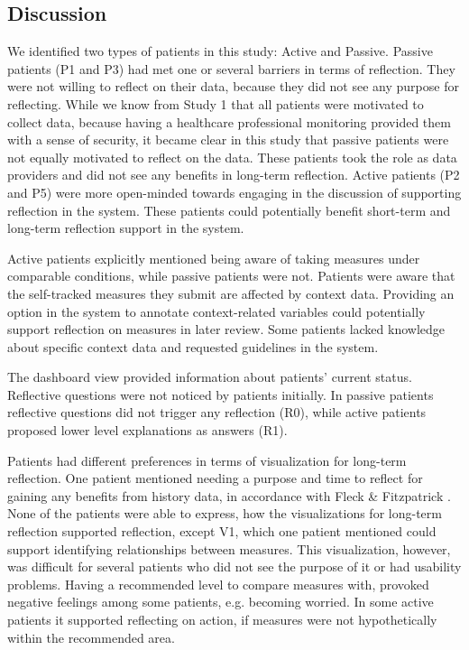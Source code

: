 \subsection{Discussion}
We identified two types of patients in this study: Active and Passive. Passive patients (P1 and P3) had met one or several barriers in terms of reflection. They were not willing to reflect on their data, because they did not see any purpose for reflecting. While we know from Study 1 that all patients were motivated to collect data, because having a healthcare professional monitoring provided them with a sense of security, it became clear in this study that passive patients were not equally motivated to reflect on the data. These patients took the role as data providers and did not see any benefits in long-term reflection. Active patients (P2 and P5) were more open-minded towards engaging in the discussion of supporting reflection in the system. These patients could potentially benefit short-term and long-term reflection support in the system.

Active patients explicitly mentioned being aware of taking measures under comparable conditions, while passive patients were not. Patients were aware that the self-tracked measures they submit are affected by context data. Providing an option in the system to annotate context-related variables could potentially support reflection on measures in later review. Some patients lacked knowledge about specific context data and requested guidelines in the system. 

The dashboard view provided information about patients’ current status. Reflective questions were not noticed by patients initially. In passive patients reflective questions did not trigger any reflection (R0), while active patients proposed lower level explanations as answers (R1). 

Patients had different preferences in terms of visualization for long-term reflection. One patient mentioned needing a purpose and time to reflect for gaining any benefits from history data, in accordance with Fleck \& Fitzpatrick \cite{Fleck}. None of the patients were able to express, how the visualizations for long-term reflection supported reflection, except V1, which one patient mentioned could support identifying relationships between measures. This visualization, however, was difficult for several patients who did not see the purpose of it or had usability problems. Having a recommended level to compare measures with, provoked negative feelings among some patients, e.g. becoming worried. In some active patients it supported reflecting on action, if measures were not hypothetically within the recommended area. 

